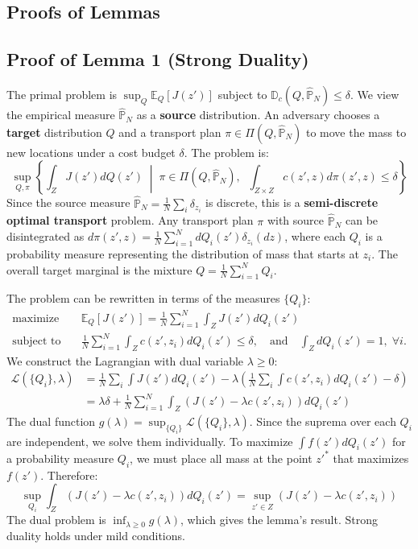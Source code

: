 \documentclass[12pt]{report}
\begin{document}
\begin{appendix}

\section{Proofs of Lemmas}

\subsection{Proof of Lemma 1 (Strong Duality)}\label{sec:lemma1} 
The primal problem is $\sup_{Q} \mathbb{E}_Q[J(z')]$ subject to $\mathbb{D}_c(Q, \hat{\mathbb{P}}_N) \le \delta$. 
We view the empirical measure $\hat{\mathbb{P}}_N$ as a \textbf{source} distribution. 
An adversary chooses a \textbf{target} distribution $Q$ and a transport plan $\pi \in \Pi(Q, \hat{\mathbb{P}}_N)$ to move the mass to new locations under a cost budget $\delta$. 
The problem is:
\[
\sup_{Q, \pi} \left\{ \int_{Z} J(z') dQ(z') \;\middle|\; \pi \in \Pi(Q, \hat{\mathbb{P}}_N), \;\; \int_{Z \times Z} c(z', z) d\pi(z', z) \le \delta \right\}
\]
Since the source measure $\hat{\mathbb{P}}_N = \frac{1}{N}\sum_i \delta_{z_i}$ is discrete, this is a \textbf{semi-discrete optimal transport} problem. 
Any transport plan $\pi$ with source $\hat{\mathbb{P}}_N$ can be disintegrated as $d\pi(z', z) = \frac{1}{N}\sum_{i=1}^N dQ_i(z') \delta_{z_i}(dz)$, 
where each $Q_i$ is a probability measure representing the distribution of mass that starts at $z_i$. The overall target marginal is the mixture $Q = \frac{1}{N}\sum_{i=1}^N Q_i$.

The problem can be rewritten in terms of the measures $\{Q_i\}$:
\begin{align*}
\text{maximize} \quad & \mathbb{E}_Q[J(z')] = \frac{1}{N}\sum_{i=1}^N \int_Z J(z') dQ_i(z') \\
\text{subject to} \quad & \frac{1}{N}\sum_{i=1}^N \int_Z c(z', z_i) dQ_i(z') \le \delta, \quad \text{and} \quad \int_Z dQ_i(z') = 1, \; \forall i.
\end{align*}
We construct the Lagrangian with dual variable $\lambda \ge 0$:
\begin{align*}
\mathcal{L}(\{Q_i\}, \lambda) &= \frac{1}{N}\sum_i \int J(z') dQ_i(z') - \lambda \left( \frac{1}{N}\sum_i \int c(z', z_i) dQ_i(z') - \delta \right) \\
&= \lambda\delta + \frac{1}{N}\sum_{i=1}^N \int_Z \left( J(z') - \lambda c(z', z_i) \right) dQ_i(z')
\end{align*}
The dual function $g(\lambda) = \sup_{\{Q_i\}} \mathcal{L}(\{Q_i\}, \lambda)$. Since the suprema over each $Q_i$ are independent, we solve them individually. 
To maximize $\int f(z') dQ_i(z')$ for a probability measure $Q_i$, we must place all mass at the point $z'^*$ that maximizes $f(z')$. Therefore:
\[
\sup_{Q_i} \int_Z \left( J(z') - \lambda c(z', z_i) \right) dQ_i(z') = \sup_{z' \in Z} \left( J(z') - \lambda c(z', z_i) \right)
\]
The dual problem is $\inf_{\lambda \ge 0} g(\lambda)$, which gives the lemma's result. Strong duality holds under mild conditions.
\newpage

\end{appendix}
\end{document}
